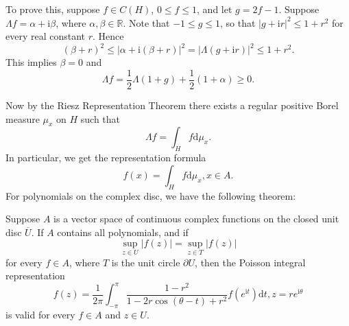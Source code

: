 To prove this, suppose $f\in C(H)$, $0\le f\le 1$, and let $g=2f-1$. Suppose $\Lambda f=\alpha+\mathrm{i}\beta$, where $\alpha,\beta\in\mathbb{R}$. Note that $-1\le g\le 1$, so that $|g+\mathrm{i}r|^2\le 1+r^2$ for every real constant $r$. Hence 
$$
\left( \beta +r \right) ^2\le \left| \alpha +\mathrm{i}\left( \beta +r \right) \right|^2=\left| \Lambda \left( g+\mathrm{i}r \right) \right|^2\le 1+r^2.
$$
This implies $\beta=0$ and 
$$
\Lambda f=\frac{1}{2}\Lambda \left( 1+g \right) +\frac{1}{2}\left( 1+\alpha \right) \ge 0.
$$\par
Now by the Riesz Representation Theorem there exists a regular positive Borel measure $\mu_x$ on $H$ such that 
$$
\Lambda f=\int_H{f\mathrm{d}\mu _x}.
$$
In particular, we get the representation formula 
$$
f\left( x \right) =\int_H{f\mathrm{d}\mu _x},x\in A.
$$
For polynomials on the complex disc, we have the following theorem: 
\begin{theorem}
Suppose $A$ is a vector space of continuous complex functions on the closed unit disc $\overline{U}$. If $A$ contains all polynomials, and if 
$$
\mathop {\mathrm{sup}} \limits_{z\in U}\left| f\left( z \right) \right|=\mathop {\mathrm{sup}} \limits_{z\in T}\left| f\left( z \right) \right|
$$
for every $f\in A$, where $T$ is the unit circle $\partial U$, then the Poisson integral representation 
$$
f\left( z \right) =\frac{1}{2\pi}\int_{-\pi}^{\pi}{\frac{1-r^2}{1-2r\cos \left( \theta -t \right) +r^2}f\left( e^{\mathrm{i}t} \right) \mathrm{d}t},z=re^{\mathrm{i}\theta}
$$
is valid for every $f\in A$ and $z\in U$.
\end{theorem}
